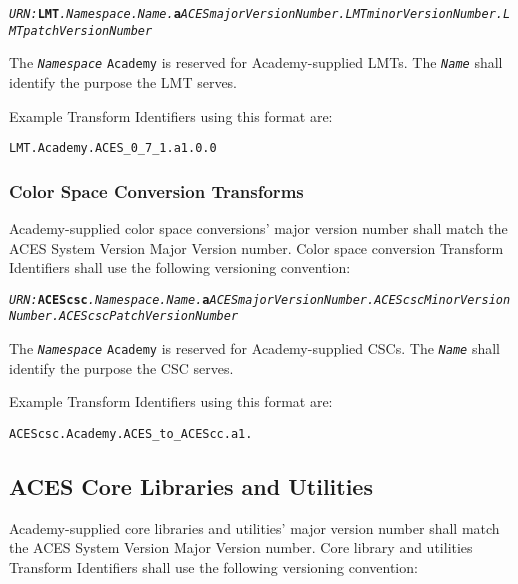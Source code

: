 \begin{sloppypar}
\texttt{\textit{URN:}\textbf{LMT}\textit{.Namespace.Name.\+}\textbf{a}\textit{ACESmajorVersionNumber.\+LMTminorVersionNumber.LMT\+patchVersionNumber}}
\end{sloppypar}

The \texttt{\textit{Namespace}} \texttt{Academy} is reserved for Academy-supplied LMTs. The \texttt{\textit{Name}} shall identify the purpose the LMT serves.

Example Transform Identifiers using this format are:

\begin{listize}
    \item \texttt{\urn{}LMT.Academy.ACES\_0\_7\_1.a1.0.0}
\end{listize}

\subsubsection{Color Space Conversion Transforms}
Academy-supplied color space conversions' major version number shall match the ACES System Version Major Version number. Color space conversion Transform Identifiers shall use the following versioning convention:

\begin{sloppypar}
\texttt{\textit{URN:}\textbf{ACEScsc}\textit{.Namespace.Name.\+}\textbf{a}\textit{ACESmajorVersionNumber.\+ACEScscMinorVersionNumber.\+ACEScsc\+PatchVersionNumber}}
\end{sloppypar}

The \texttt{\textit{Namespace}} \texttt{Academy} is reserved for Academy-supplied CSCs. The \texttt{\textit{Name}} shall identify the purpose the CSC serves.

Example Transform Identifiers using this format are:

\begin{listize}
    \item \texttt{\urn{}ACEScsc.Academy.ACES\_to\_ACEScc\+.a1.}
\end{listize}

\subsection{ACES Core Libraries and Utilities}
Academy-supplied core libraries and utilities' major version number shall match the ACES System Version Major Version number. Core library and utilities Transform Identifiers shall use the following versioning convention:

